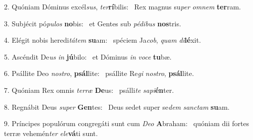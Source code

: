 2. Quóniam Dóminus excél\textit{sus}, \textit{ter}\textbf{rí}bilis: \ast\  Rex magnus su\textit{per} \textit{om}\textit{nem} \textbf{ter}ram.\

3. Subjécit pó\textit{pu}\textit{los} \textbf{no}bis: \ast\  et Gentes sub \textit{pé}\textit{di}\textit{bus} \textbf{nos}tris.\

4. Elégit nobis heredi\textit{tá}\textit{tem} \textbf{su}am: \ast\  spéciem Ja\textit{cob}, \textit{quam} \textit{di}\textbf{lé}xit.\

5. Ascéndit De\textit{us} \textit{in} \textbf{jú}bilo: \ast\  et Dóminus \textit{in} \textit{vo}\textit{ce} \textbf{tu}bæ.\

6. Psállite Deo \textit{nos}\textit{tro}, \textbf{psál}lite: \ast\  psállite Re\textit{gi} \textit{nos}\textit{tro}, \textbf{psál}lite.\

7. Quóniam Rex omnis \textit{ter}\textit{ræ} \textbf{De}us: \ast\  psálli\textit{te} \textit{sa}\textit{pi}\textbf{én}ter.\

8. Regnábit Deus \textit{su}\textit{per} \textbf{Gen}tes: \ast\  Deus sedet super se\textit{dem} \textit{sanc}\textit{tam} \textbf{su}am.\

9. Príncipes populórum congregáti sunt cum \textit{De}\textit{o} \textbf{A}braham: \ast\  quóniam dii fortes terræ vehemén\textit{ter} \textit{e}\textit{le}\textbf{vá}ti sunt.\

